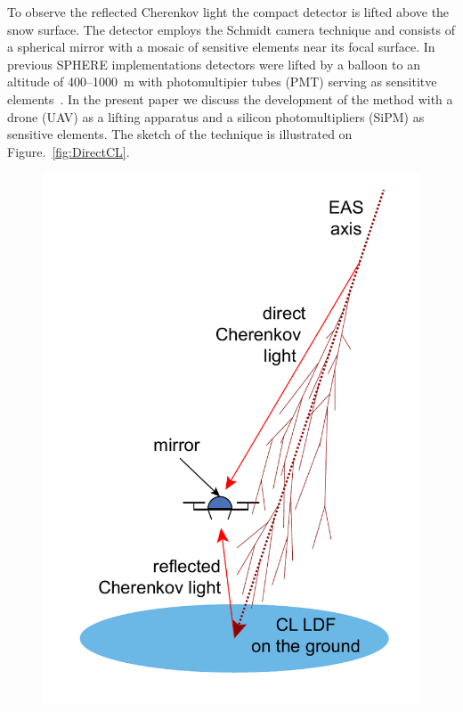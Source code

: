 \documentclass[a4paper,11pt]{article}
\begin{document}
To observe the reflected Cherenkov light the compact detector is lifted above the snow surface. The detector employs the Schmidt camera technique and consists of a spherical mirror with a mosaic of sensitive elements near its focal surface. In previous SPHERE implementations detectors were lifted by a balloon to an altitude of 400--1000~m with photomultipier tubes (PMT) serving as sensititve elements~\cite{Ant15a, Ant19, Ant20}. In the present paper we discuss the development of the method with a drone (UAV) as a lifting apparatus and a silicon photomultipliers (SiPM) as sensitive elements. The sketch of the technique is illustrated on Figure.~\ref{fig:DirectCL}.


\begin{figure}
    \begin{minipage}[b]{.42\textwidth}
    \centering 
        \includegraphics[height=.365\textheight]{DirectCL.pdf}

\end{minipage}
\end{figure}
\end{document}
